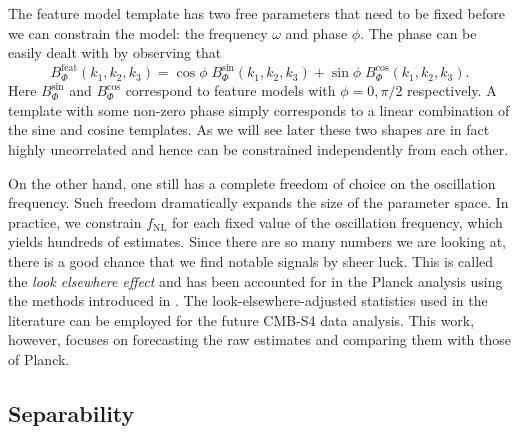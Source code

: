 The feature model template has two free parameters that need to be fixed before we can constrain the model: the frequency $\omega$ and phase $\phi$. The phase can be easily dealt with by observing that
\begin{equation}
	B_\Phi^\text{feat}(k_1, k_2, k_3) = \cos\phi \; B_\Phi^\text{sin} (k_1, k_2, k_3) + \sin\phi \; B_\Phi^\text{cos} (k_1, k_2, k_3).
	\label{feature model bispectrum as a sum of sin and cos}
\end{equation}
Here $B_\Phi^\text{sin}$ and $B_\Phi^\text{cos}$ correspond to feature models with $\phi = 0, \pi/2$ respectively. A template with some non-zero phase simply corresponds to a linear combination of the sine and cosine templates. As we will see later these two shapes are in fact highly uncorrelated and hence can be constrained independently from each other.

On the other hand, one still has a complete freedom of choice on the oscillation frequency. Such freedom dramatically expands the size of the parameter space. In practice, we constrain $f_\text{NL}$ for each fixed value of the oscillation frequency, which yields hundreds of estimates. Since there are so many numbers we are looking at, there is a good chance that we find notable signals by sheer luck. This is called the \textit{look elsewhere effect} and has been accounted for in the Planck analysis \cite{PlanckCollaboration2015,PlanckCollaboration2018} using the methods introduced in \cite{Fergusson2015a,Fergusson2015b}. The look-elsewhere-adjusted statistics used in the literature can be employed for the future CMB-S4 data analysis. This work, however, focuses on forecasting the raw estimates and comparing them with those of Planck.


\subsection{Separability}

